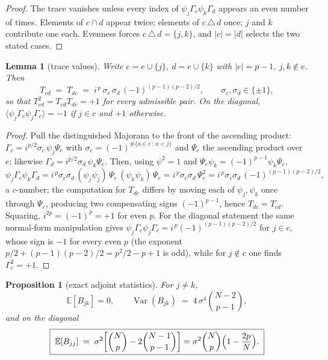 \documentclass[11pt]{article}
\newtheorem{lemma}{Lemma}
\newtheorem{proposition}{Proposition}
\newcommand{\Var}{\operatorname{Var}}
\begin{document}
\begin{proof}
The trace vanishes unless every index of
$\psi_j\Gamma_c\psi_k\Gamma_d$ appears an even number of times. Elements of
$c\cap d$ appear twice; elements of $c\,\triangle\,d$ once; $j$ and $k$
contribute one each. Evenness forces $c\,\triangle\,d=\{j,k\}$, and $|c|=|d|$
selects the two stated cases.
\end{proof}

\begin{lemma}[trace values]\label{lem:values}
Write $c=e\cup\{j\}$, $d=e\cup\{k\}$ with $|e|=p-1$, $j,k\notin e$. Then
\begin{equation}
T_{cd}\;=\;T_{dc}\;=\;i^{\,p}\,\sigma_c\,\sigma_d\,(-1)^{(p-1)(p-2)/2},
\qquad \sigma_c,\sigma_d\in\{\pm1\},
\end{equation}
so that $T_{cd}^2=T_{cd}T_{dc}=+1$ for every admissible pair. On the diagonal,
$\langle\psi_j\Gamma_c\psi_j\Gamma_c\rangle=-1$ if $j\in c$ and $+1$
otherwise.
\end{lemma}

\begin{proof}
Pull the distinguished Majorana to the front of the ascending product:
$\Gamma_c=i^{p/2}\sigma_c\,\psi_j\Psi_e$ with
$\sigma_c=(-1)^{\#\{a\in e\,:\,a<j\}}$ and $\Psi_e$ the ascending product over
$e$; likewise $\Gamma_d=i^{p/2}\sigma_d\,\psi_k\Psi_e$. Then, using
$\psi^2=1$ and $\Psi_e\psi_k=(-1)^{p-1}\psi_k\Psi_e$,
\begin{equation}
\psi_j\Gamma_c\psi_k\Gamma_d
= i^{\,p}\sigma_c\sigma_d\,(\psi_j\psi_j)\,\Psi_e\,(\psi_k\psi_k)\,\Psi_e
= i^{\,p}\sigma_c\sigma_d\,\Psi_e^2
= i^{\,p}\sigma_c\sigma_d\,(-1)^{(p-1)(p-2)/2},
\end{equation}
a $c$-number; the computation for $T_{dc}$ differs by moving each of
$\psi_j,\psi_k$ once through $\Psi_e$, producing two compensating signs
$(-1)^{p-1}$, hence $T_{dc}=T_{cd}$. Squaring, $i^{2p}=(-1)^p=+1$ for even
$p$. For the diagonal statement the same normal-form manipulation gives
$\psi_j\Gamma_c\psi_j\Gamma_c=i^{\,p}(-1)^{(p-1)(p-2)/2}$ for $j\in c$, whose
sign is $-1$ for every even $p$ (the exponent
$p/2+(p-1)(p-2)/2=p^2/2-p+1$ is odd), while for $j\notin c$ one finds
$\Gamma_c^2=+1$.
\end{proof}

\begin{proposition}[exact adjoint statistics]\label{prop:main}
For $j\neq k$,
\begin{equation}
\boxed{\;\mathbb E[B_{jk}]=0,\qquad
\Var(B_{jk})\;=\;4\,\sigma^4\binom{N-2}{p-1},\;}
\label{eq:var}
\end{equation}
and on the diagonal
\begin{equation}
\boxed{\;\mathbb E[B_{jj}]\;=\;\sigma^2\!\left[\binom{N}{p}-2\binom{N-1}{p-1}\right]
=\sigma^2\binom{N}{p}\Bigl(1-\frac{2p}{N}\Bigr).\;}
\label{eq:diag}
\end{equation}
\end{proposition}
\end{document}
